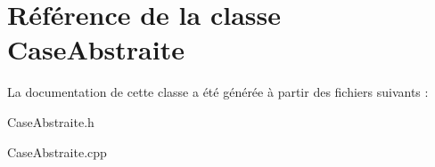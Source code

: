 \hypertarget{classCaseAbstraite}{\section{\-Référence de la classe \-Case\-Abstraite}
\label{classCaseAbstraite}
}


\-La documentation de cette classe a été générée à partir des fichiers suivants \-:\begin{DoxyCompactItemize}
\item 
\-Case\-Abstraite.\-h\item 
\-Case\-Abstraite.\-cpp\end{DoxyCompactItemize}
